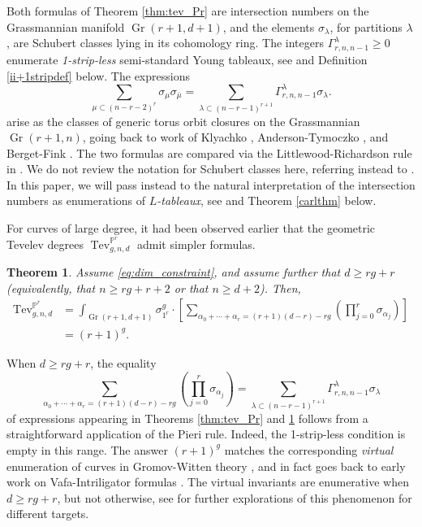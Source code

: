 \documentclass[12pt]{amsart}
\def\bP{\mathbb{P}}
\DeclareMathOperator{\Gr}{Gr}
\DeclareMathOperator{\Tev}{Tev}
\newtheorem{theorem}[definition]{Theorem}
\begin{document}
Both formulas of Theorem \ref{thm:tev_Pr} are intersection numbers on the Grassmannian manifold $\Gr(r+1,d+1)$, and the elements $\sigma_{\lambda}$, for partitions $\lambda$, are Schubert classes lying in its cohomology ring. The integers $\Gamma^{\lambda}_{r,n,n-1}\ge0$ enumerate \emph{1-strip-less} semi-standard Young tableaux, see \cite{lian_lr} and Definition \ref{ii+1stripdef} below. The expressions
\begin{equation*}
    \sum_{\mu\subset(n-r-2)^{r}}\sigma_{\mu}\sigma_{\overline{\mu}}=\sum_{\lambda\subset (n-r-1)^{r+1}} \Gamma^\lambda_{r,n,n-1}\sigma_{\lambda}.
\end{equation*}
arise as the classes of generic torus orbit closures on the Grassmannian $\Gr(r+1,n)$, going back to work of Klyachko \cite{klyachko}, Anderson-Tymoczko \cite{at}, and Berget-Fink \cite{bf}. The two formulas are compared via the Littlewood-Richardson rule in \cite{lian_lr}. We do not review the notation for Schubert classes here, referring instead to \cite{tev_Pr}. In this paper, we will pass instead to the natural interpretation of the intersection numbers as enumerations of \emph{$L$-tableaux}, see \cite[Definition 1.1]{GenRSK} and Theorem \ref{carlthm} below.

For curves of large degree, it had been observed earlier that the geometric Tevelev degrees $\Tev^{\bP^r}_{g,n,d}$ admit simpler formulas.

\begin{theorem}\cite[Theorem 1.1, Theorem 1.2]{fl}\label{thm:large_deg}
Assume \eqref{eq:dim_constraint}, and assume further that $d\ge rg+r$ (equivalently, that $n\ge rg+r+2$ or that $n\ge d+2$). Then, 
    \begin{align*}
\Tev^{\bP^r}_{g,n,d}&=\displaystyle\int_{\Gr(r+1,d+1)}\sigma^g_{1^r}\cdot \left[\sum_{\alpha_0+\cdots+\alpha_r=(r+1)(d-r)-rg}\left(\prod_{j=0}^{r}\sigma_{\alpha_j}\right)\right]\\
&=(r+1)^g.
\end{align*}
\end{theorem}
When $d\ge rg+r$, the equality
\begin{equation*}
\sum_{\alpha_0+\cdots+\alpha_r=(r+1)(d-r)-rg}\left(\prod_{j=0}^{r}\sigma_{\alpha_j}\right)=\sum_{\lambda\subset (n-r-1)^{r+1}} \Gamma^\lambda_{r,n,n-1}\sigma_{\lambda}
\end{equation*}
of expressions appearing in Theorems \ref{thm:tev_Pr} and \ref{thm:large_deg} follows from a straightforward application of the Pieri rule. Indeed, the 1-strip-less condition is empty in this range. The answer $(r+1)^g$ matches the corresponding \emph{virtual} enumeration of curves in Gromov-Witten theory \cite[(3)]{bp}, and in fact goes back to early work on Vafa-Intriligator formulas \cite{bdw,st,mo}. The virtual invariants are enumerative when $d\ge rg+r$, but not otherwise, see \cite{Enumvir,bllrst,celadoan} for further explorations of this phenomenon for different targets.
\end{document}
